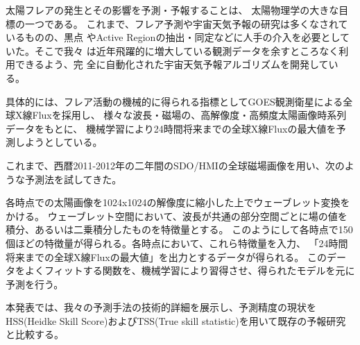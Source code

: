 \documentclass{2014a}
\begin{document}

太陽フレアの発生とその影響を予測・予報することは、
太陽物理学の大きな目標の一つである。
これまで、フレア予測や宇宙天気予報の研究は多くなされているものの、黒点
やActive Regionの抽出・同定などに人手の介入を必要としていた。そこで我々
は近年飛躍的に増大している観測データを余すところなく利用できるよう、完
全に自動化された宇宙天気予報アルゴリズムを開発している。

具体的には、フレア活動の機械的に得られる指標としてGOES観測衛星による全球X線Fluxを採用し、
様々な波長・磁場の、高解像度・高頻度太陽画像時系列データをもとに、
機械学習により24時間将来までの全球X線Fluxの最大値を予測しようとしている。

これまで、西暦2011-2012年の二年間のSDO/HMIの全球磁場画像を用い、次のような予測法を試してきた。

各時点での太陽画像を1024x1024の解像度に縮小した上でウェーブレット変換をかける。
ウェーブレット空間において、波長が共通の部分空間ごとに場の値を積分、あるいは二乗積分したものを特徴量とする。
このようにして各時点で150個ほどの特徴量が得られる。各時点において、これら特徴量を入力、
「24時間将来までの全球X線Fluxの最大値」を出力とするデータが得られる。
このデータをよくフィットする関数を、機械学習により習得させ、得られたモデルを元に予測を行う。

本発表では、我々の予測手法の技術的詳細を展示し、予測精度の現状をHSS(Heidke Skill Score)およびTSS(True skill statistic)を用いて既存の予報研究と比較する。


\end{document}
